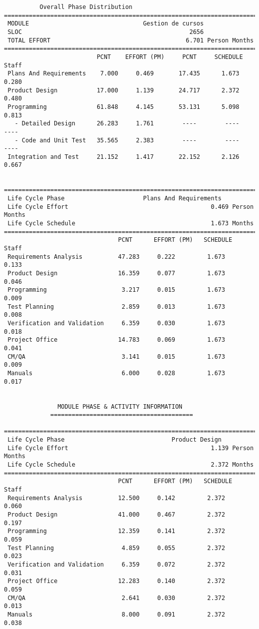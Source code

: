 \documentclass[11pt,a4paper,spanish,twoside]{report}
\begin{document}
{\begin{verbatim}
          Overall Phase Distribution
==============================================================================
 MODULE                                Gestion de cursos
 SLOC                                               2656
 TOTAL EFFORT                                      6.701 Person Months
==============================================================================
                          PCNT    EFFORT (PM)     PCNT     SCHEDULE       Staff
 Plans And Requirements    7.000     0.469       17.435      1.673       0.280
 Product Design           17.000     1.139       24.717      2.372       0.480
 Programming              61.848     4.145       53.131      5.098       0.813
   - Detailed Design      26.283     1.761        ----        ----        ----
   - Code and Unit Test   35.565     2.383        ----        ----        ----
 Integration and Test     21.152     1.417       22.152      2.126       0.667


==============================================================================
 Life Cycle Phase                      Plans And Requirements
 Life Cycle Effort                                        0.469 Person Months
 Life Cycle Schedule                                      1.673 Months
==============================================================================
                                PCNT      EFFORT (PM)   SCHEDULE       Staff   
 Requirements Analysis          47.283     0.222         1.673        0.133
 Product Design                 16.359     0.077         1.673        0.046
 Programming                     3.217     0.015         1.673        0.009
 Test Planning                   2.859     0.013         1.673        0.008
 Verification and Validation     6.359     0.030         1.673        0.018
 Project Office                 14.783     0.069         1.673        0.041
 CM/QA                           3.141     0.015         1.673        0.009
 Manuals                         6.000     0.028         1.673        0.017


		       MODULE PHASE & ACTIVITY INFORMATION
		     ========================================

==============================================================================
 Life Cycle Phase                              Product Design
 Life Cycle Effort                                        1.139 Person Months
 Life Cycle Schedule                                      2.372 Months
==============================================================================
                                PCNT      EFFORT (PM)   SCHEDULE       Staff   
 Requirements Analysis          12.500     0.142         2.372        0.060
 Product Design                 41.000     0.467         2.372        0.197
 Programming                    12.359     0.141         2.372        0.059
 Test Planning                   4.859     0.055         2.372        0.023
 Verification and Validation     6.359     0.072         2.372        0.031
 Project Office                 12.283     0.140         2.372        0.059
 CM/QA                           2.641     0.030         2.372        0.013
 Manuals                         8.000     0.091         2.372        0.038


\end{verbatim}}
\end{document}
